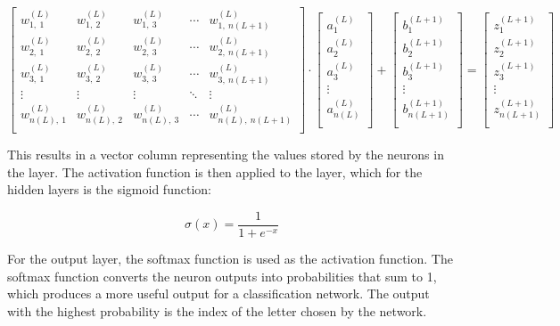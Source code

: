 \documentclass{article}
\begin{document}
\(\begin{bmatrix}
    w_{1,\ 1}^{(L)} & w_{1,\ 2}^{(L)} & w_{1,\ 3}^{(L)} & \cdots & w_{1,\ n(L+1)}^{(L)} \\
    w_{2,\ 1}^{(L)} & w_{2,\ 2}^{(L)} & w_{2,\ 3}^{(L)} & \cdots & w_{2,\ n(L+1)}^{(L)} \\
    w_{3,\ 1}^{(L)} & w_{3,\ 2}^{(L)} & w_{3,\ 3}^{(L)} & \cdots & w_{3,\ n(L+1)}^{(L)} \\
    \vdots & \vdots & \vdots & \ddots & \vdots \\
    w_{n(L),\ 1}^{(L)} & w_{n(L),\ 2}^{(L)} & w_{n(L),\ 3}^{(L)} & \cdots & w_{n(L),\ n(L+1)}^{(L)} \\
\end{bmatrix}
\cdot
\begin{bmatrix}
    a_1^{(L)} \\
    a_2^{(L)} \\
    a_3^{(L)} \\
    \vdots \\
    a_{n(L)}^{(L)} \\
\end{bmatrix}
+
\begin{bmatrix}
    b_1^{(L+1)} \\
    b_2^{(L+1)} \\
    b_3^{(L+1)} \\
    \vdots \\
    b_{n(L+1)}^{(L+1)} \\
\end{bmatrix}
=
\begin{bmatrix}
    z_1^{(L+1)} \\
    z_2^{(L+1)} \\
    z_3^{(L+1)} \\
    \vdots \\
    z_{n(L+1)}^{(L+1)} \\
\end{bmatrix}\)

\vspace{1em}
This results in a vector column representing the values stored by the neurons in the layer. The activation function is then applied to the layer, which for the hidden layers is the sigmoid function:

\begin{equation*}
    \sigma(x)=\frac{1}{1+e^{-x}}
\end{equation*}

For the output layer, the softmax function is used as the activation function. The softmax function converts the neuron outputs into probabilities that sum to 1, which produces a more useful output for a classification network. The output with the highest probability is the index of the letter chosen by the network.
\end{document}
